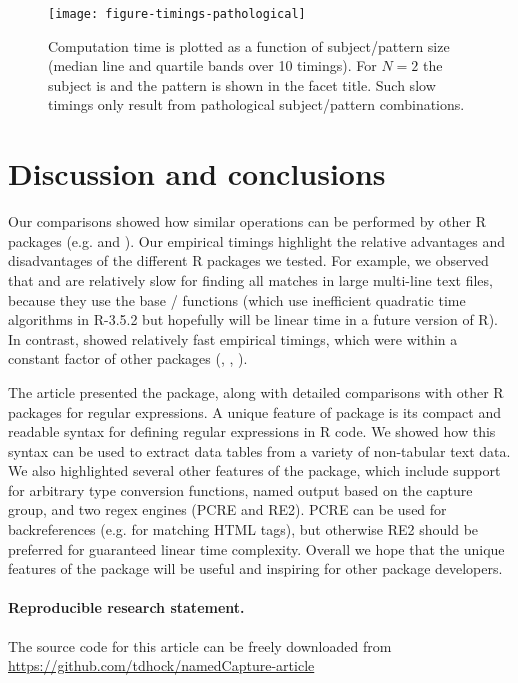 \begin{figure}
  \texttt{[image: figure-timings-pathological]}
  \vskip -0.5cm
  \caption{\label{fig:timings-pathological} Computation time is
    plotted as a function of subject/pattern size (median line and
    quartile bands over 10 timings). For $N=2$ the subject is 
    and the pattern is shown in the facet title. Such slow timings
    only result from pathological subject/pattern combinations.}
\end{figure}

\section{Discussion and conclusions}

Our comparisons showed how similar operations can be performed by
other R packages (e.g.  and ). Our
empirical timings highlight the relative advantages and disadvantages
of the different R packages we tested. For example, we observed that
 and  are relatively slow for finding
all matches in large multi-line text files, because they use the base
/ functions (which use inefficient
quadratic time algorithms in R-3.5.2 but hopefully will be linear time
in a future version of R). In contrast,  showed
relatively fast empirical timings, which were within a constant factor
of other packages (, ,
). 

The article presented the  package, along with
detailed comparisons with other R packages for regular expressions.  A
unique feature of  package is its compact and
readable syntax for defining regular expressions in R code. We showed
how this syntax can be used to extract data tables from a variety of
non-tabular text data. We also highlighted several other features of
the  package, which include support for
arbitrary type conversion functions, named output based on the
 capture group, and two regex engines (PCRE and RE2). PCRE
can be used for backreferences (e.g. for matching HTML tags), but
otherwise RE2 should be preferred for guaranteed linear time
complexity.
Overall we hope that the unique features of the 
package will be useful and inspiring for other package developers.  


\paragraph{Reproducible research statement.} The source code for this
article can be freely downloaded from
\url{https://github.com/tdhock/namedCapture-article}

